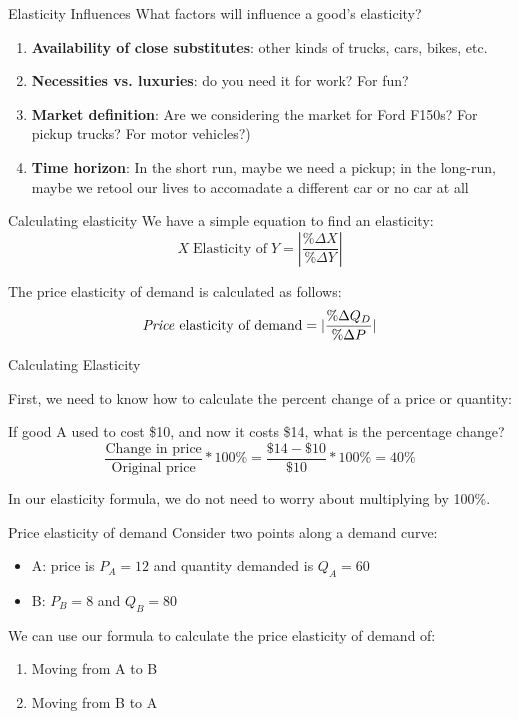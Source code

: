 \documentclass[compress]{beamer}
\begin{document}
\begin{frame}{Elasticity Influences}
    What factors will influence a good's elasticity?

    \begin{enumerate}
        \item \textbf{Availability of close substitutes}: other kinds of trucks, cars, bikes, etc.
        \item \textbf{Necessities vs. luxuries}: do you need it for work? For fun?
        \item \textbf{Market definition}: Are we considering the market for Ford F150s? For pickup trucks? For motor vehicles?)
        \item \textbf{Time horizon}: In the short run, maybe we need a pickup; in the long-run, maybe we retool our lives to accomadate a different car or no car at all
    \end{enumerate}
\end{frame}


\begin{frame}{Calculating elasticity}
    We have a simple equation to find an elasticity:
    \medskip
    \[X\; \text{Elasticity of}\; Y = | \frac{\%\Delta X}{\% \Delta Y}|\]
    
\vspace{3mm}

The price elasticity of demand is calculated as follows:
    $$
    \text{\textit{Price} elasticity of demand} = |\frac{\% \Delta Q_D}{\% \Delta P}|
    $$

\end{frame}

 
 \begin{frame}{Calculating Elasticity}
    \begin{block}{First, we need to know how to calculate the percent change of a price or quantity:}

    If good A used to cost \$10, and now it costs \$14, what is the percentage change?
    $$
    \dfrac{\text{Change in price}}{\text{Original price}} * 100\% = \dfrac{\$14 - \$10}{\$10} * 100\% = 40\%
    $$
    \end{block}
\medskip
    In our elasticity formula, we do not need to worry about multiplying by 100\%.
\end{frame}

\begin{frame}{Price elasticity of demand}
    Consider two points along a demand curve:
    \begin{itemize}
        \item A: price is \(P_A = 12\) and quantity demanded is \(Q_A = 60\)
        \item B: \(P_B = 8\) and \(Q_B = 80\)
    \end{itemize}
    \medskip
    We can use our formula to calculate the price elasticity of demand of:
    \begin{enumerate}
        \item Moving from A to B
        \item Moving from B to A
    \end{enumerate}
\end{frame}
\end{document}
